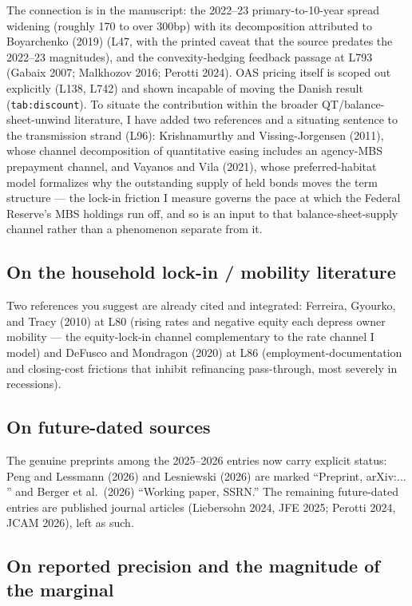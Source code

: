 \documentclass[11pt]{article}
\newcommand{\mlabel}[1]{\texttt{#1}}
\begin{document}
The connection is in the manuscript: the 2022--23 primary-to-10-year spread
widening (roughly 170 to over 300bp) with its decomposition attributed to
Boyarchenko (2019) (L47, with the printed caveat that the source predates the
2022--23 magnitudes), and the convexity-hedging feedback passage at L793
(Gabaix 2007; Malkhozov 2016; Perotti 2024). OAS pricing itself is scoped out
explicitly (L138, L742) and shown incapable of moving the Danish result
(\mlabel{tab:discount}). To situate the contribution within the broader
QT/balance-sheet-unwind literature, I have added two references and a situating
sentence to the transmission strand (L96): Krishnamurthy and Vissing-Jorgensen
(2011), whose channel decomposition of quantitative easing includes an
agency-MBS prepayment channel, and Vayanos and Vila (2021), whose
preferred-habitat model formalizes why the outstanding supply of held bonds
moves the term structure --- the lock-in friction I measure governs the pace at
which the Federal Reserve's MBS holdings run off, and so is an input to that
balance-sheet-supply channel rather than a phenomenon separate from it.

\subsection*{On the household lock-in / mobility literature}

Two references you suggest are already cited and integrated: Ferreira, Gyourko,
and Tracy (2010) at L80 (rising rates and negative equity each depress owner
mobility --- the equity-lock-in channel complementary to the rate channel I
model) and DeFusco and Mondragon (2020) at L86 (employment-documentation and
closing-cost frictions that inhibit refinancing pass-through, most severely in
recessions).

\subsection*{On future-dated sources}

The genuine preprints among the 2025--2026 entries now carry explicit status:
Peng and Lessmann (2026) and Lesniewski (2026) are marked ``Preprint,
arXiv:$\ldots$'' and Berger et al.\ (2026) ``Working paper, SSRN.'' The
remaining future-dated entries are published journal articles (Liebersohn 2024,
JFE 2025; Perotti 2024, JCAM 2026), left as such.

\subsection*{On reported precision and the magnitude of the marginal}
\end{document}
